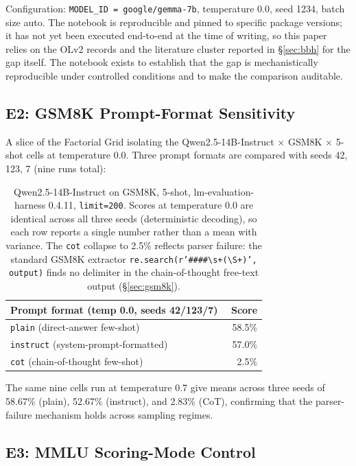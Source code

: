 \documentclass[11pt]{article}
\begin{document}
Configuration: \texttt{MODEL\_ID = google/gemma-7b}, temperature 0.0, seed
1234, batch size auto. The notebook is reproducible and pinned to specific
package versions; it has not yet been executed end-to-end at the time of
writing, so this paper relies on the OLv2 records and the literature
cluster reported in \S\ref{sec:bbh} for the gap itself. The notebook
exists to establish that the gap is mechanistically reproducible under
controlled conditions and to make the comparison auditable.


\subsection{E2: GSM8K Prompt-Format Sensitivity}
\label{app:exp-e2}

A slice of the Factorial Grid isolating the Qwen2.5-14B-Instruct $\times$
GSM8K $\times$ 5-shot cells at temperature 0.0. Three prompt formats are
compared with seeds 42, 123, 7 (nine runs total):

\begin{table}[ht]
\centering
\small
\begin{tabular}{lr}
\toprule
Prompt format (temp 0.0, seeds 42/123/7) & Score \\
\midrule
\texttt{plain} (direct-answer few-shot)      & 58.5\% \\
\texttt{instruct} (system-prompt-formatted)  & 57.0\% \\
\texttt{cot} (chain-of-thought few-shot)     & ~~2.5\% \\
\bottomrule
\end{tabular}
\caption{Qwen2.5-14B-Instruct on GSM8K, 5-shot, lm-evaluation-harness
0.4.11, \texttt{limit=200}. Scores at temperature 0.0 are identical
across all three seeds (deterministic decoding), so each row reports a
single number rather than a mean with variance. The \texttt{cot}
collapse to 2.5\% reflects parser failure: the standard GSM8K extractor
\texttt{re.search(r'\#\#\#\#\textbackslash s+(\textbackslash S+)', output)}
finds no delimiter in the chain-of-thought free-text output
(\S\ref{sec:gsm8k}).}
\label{tab:e2-gsm8k}
\end{table}

The same nine cells run at temperature 0.7 give means across three seeds
of 58.67\% (plain), 52.67\% (instruct), and 2.83\% (CoT), confirming that
the parser-failure mechanism holds across sampling regimes.


\subsection{E3: MMLU Scoring-Mode Control}
\label{app:exp-e3}
\end{document}
